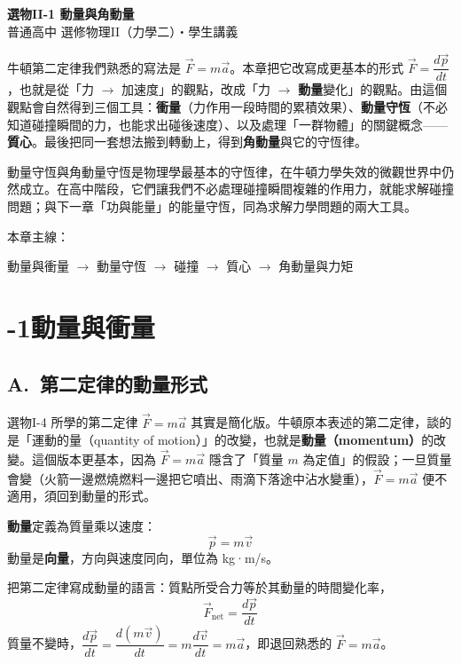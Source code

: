 \documentclass[11pt]{article}
\begin{document}
\begin{center}
{\sffamily\Huge\bfseries 選物II-1 動量與角動量}\\[3pt]
{\sffamily\large 普通高中 選修物理II（力學二）・學生講義}
\end{center}
\vspace{0.6em}

牛頓第二定律我們熟悉的寫法是 $\vec F=m\vec a$。本章把它改寫成更基本的形式 $\vec F=\dfrac{d\vec p}{dt}$，也就是從「力 $\rightarrow$ 加速度」的觀點，改成「力 $\rightarrow$ \textbf{動量}變化」的觀點。由這個觀點會自然得到三個工具：\textbf{衝量}（力作用一段時間的累積效果）、\textbf{動量守恆}（不必知道碰撞瞬間的力，也能求出碰後速度）、以及處理「一群物體」的關鍵概念——\textbf{質心}。最後把同一套想法搬到轉動上，得到\textbf{角動量}與它的守恆律。

動量守恆與角動量守恆是物理學最基本的守恆律，在牛頓力學失效的微觀世界中仍然成立。在高中階段，它們讓我們不必處理碰撞瞬間複雜的作用力，就能求解碰撞問題；與下一章「功與能量」的能量守恆，同為求解力學問題的兩大工具。

\medskip
本章主線：

\begin{center}
動量與衝量 $\rightarrow$ 動量守恆 $\rightarrow$ 碰撞 $\rightarrow$ 質心 $\rightarrow$ 角動量與力矩
\end{center}

\section*{-1\quad 動量與衝量}

\subsection*{\sffamily A.\ 第二定律的動量形式}

選物I-4 所學的第二定律 $\vec F=m\vec a$ 其實是簡化版。牛頓原本表述的第二定律，談的是「運動的量（quantity of motion）」的改變，也就是\textbf{動量（momentum）}的改變。這個版本更基本，因為 $\vec F=m\vec a$ 隱含了「質量 $m$ 為定值」的假設；一旦質量會變（火箭一邊燃燒燃料一邊把它噴出、雨滴下落途中沾水變重），$\vec F=m\vec a$ 便不適用，須回到動量的形式。

\textbf{動量}定義為質量乘以速度：
$$\boxed{\,\vec p = m\vec v\,}$$
動量是\textbf{向量}，方向與速度同向，單位為 kg·m/s。

把第二定律寫成動量的語言：質點所受合力等於其動量的時間變化率，
$$\boxed{\,\vec F_{\text{net}} = \frac{d\vec p}{dt}\,}$$
質量不變時，$\dfrac{d\vec p}{dt}=\dfrac{d(m\vec v)}{dt}=m\dfrac{d\vec v}{dt}=m\vec a$，即退回熟悉的 $\vec F=m\vec a$。
\end{document}
